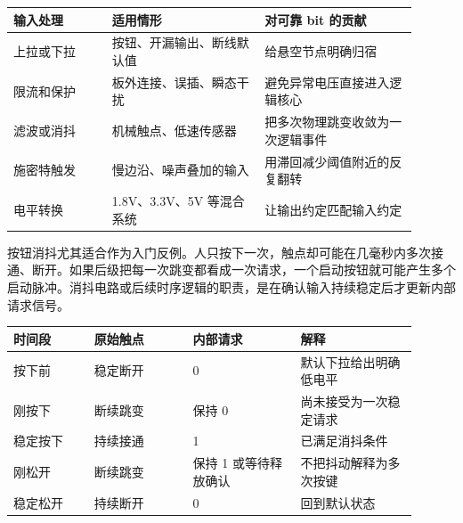\begin{longtable}{L{0.22\linewidth}L{0.34\linewidth}L{0.34\linewidth}}
\toprule
输入处理 & 适用情形 & 对可靠 bit 的贡献 \\
\midrule
上拉或下拉 & 按钮、开漏输出、断线默认值 & 给悬空节点明确归宿 \\\tablerowrule
限流和保护 & 板外连接、误插、瞬态干扰 & 避免异常电压直接进入逻辑核心 \\\tablerowrule
滤波或消抖 & 机械触点、低速传感器 & 把多次物理跳变收敛为一次逻辑事件 \\\tablerowrule
施密特触发 & 慢边沿、噪声叠加的输入 & 用滞回减少阈值附近的反复翻转 \\\tablerowrule
电平转换 & 1.8V、3.3V、5V 等混合系统 & 让输出约定匹配输入约定 \\
\bottomrule
\end{longtable}

按钮消抖尤其适合作为入门反例。人只按下一次，触点却可能在几毫秒内多次接通、断开。如果后级把每一次跳变都看成一次请求，一个启动按钮就可能产生多个启动脉冲。消抖电路或后续时序逻辑的职责，是在确认输入持续稳定后才更新内部请求信号。

\begin{longtable}{L{0.18\linewidth}L{0.22\linewidth}L{0.24\linewidth}L{0.26\linewidth}}
\toprule
时间段 & 原始触点 & 内部请求 & 解释 \\
\midrule
按下前 & 稳定断开 & 0 & 默认下拉给出明确低电平 \\\tablerowrule
刚按下 & 断续跳变 & 保持 0 & 尚未接受为一次稳定请求 \\\tablerowrule
稳定按下 & 持续接通 & 1 & 已满足消抖条件 \\\tablerowrule
刚松开 & 断续跳变 & 保持 1 或等待释放确认 & 不把抖动解释为多次按键 \\\tablerowrule
稳定松开 & 持续断开 & 0 & 回到默认状态 \\
\bottomrule
\end{longtable}

